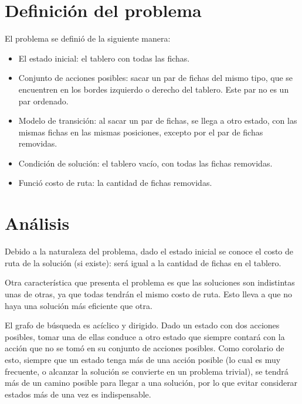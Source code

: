 \documentclass[a4paper,10pt]{article}
\begin{document}
\setcounter{page}{1}


\section{Definición del problema}

    El problema se definió de la siguiente manera:

    \begin{itemize}
        \item El estado inicial: el tablero con todas las fichas.
        \item Conjunto de acciones posibles: sacar un par de fichas del mismo tipo, que se encuentren en los bordes izquierdo o derecho del tablero. Este par no es un par ordenado.
        \item Modelo de transición: al sacar un par de fichas, se llega a otro estado, con las mismas fichas en las mismas posiciones, excepto por el par de fichas removidas.
        \item Condición de solución: el tablero vacío, con todas las fichas removidas.
        \item Funció costo de ruta: la cantidad de fichas removidas.
    \end{itemize}

\section{Análisis}

    Debido a la naturaleza del problema, dado el estado inicial se conoce el costo de ruta de la solución (si existe): será igual a la cantidad de fichas en el tablero.

    Otra característica que presenta el problema es que las soluciones son indistintas unas de otras, ya que todas tendrán el mismo costo de ruta. Esto lleva a que no haya una solución más eficiente que otra.

    El grafo de búsqueda es acíclico y dirigido. Dado un estado con dos acciones posibles, tomar una de ellas conduce a otro estado que siempre contará con la acción que no se tomó en su conjunto de acciones posibles. Como corolario de esto, siempre que un estado tenga más de una acción posible (lo cual es muy frecuente, o alcanzar la solución se convierte en un problema trivial), se tendrá más de un camino posible para llegar a una solución, por lo que evitar considerar estados más de una vez es indispensable.
\end{document}
